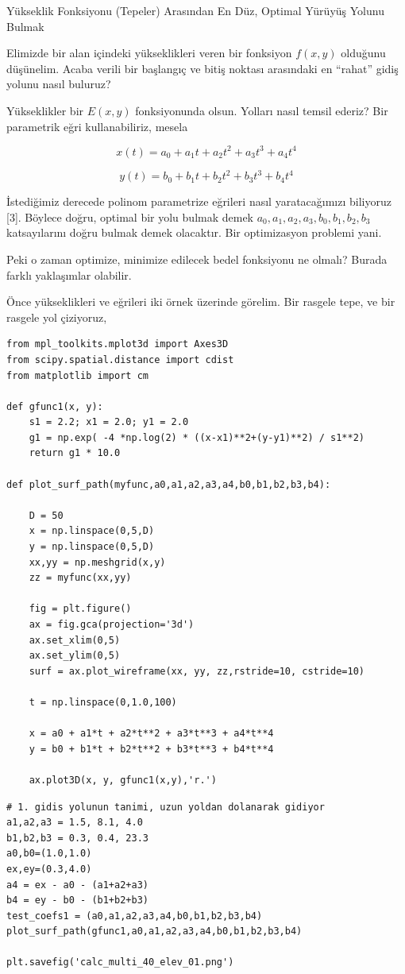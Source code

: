 \documentclass[12pt,fleqn]{article}\usepackage{../../common}
\begin{document}
Yükseklik Fonksiyonu (Tepeler) Arasından En Düz, Optimal Yürüyüş Yolunu Bulmak

Elimizde bir alan içindeki yükseklikleri veren bir fonksiyon $f(x,y)$
olduğunu düşünelim. Acaba verili bir başlangıç ve bitiş noktası arasındaki
en ``rahat'' gidiş yolunu nasıl buluruz? 

Yükseklikler bir $E(x,y)$ fonksiyonunda olsun. Yolları nasıl temsil ederiz?
Bir parametrik eğri kullanabiliriz, mesela 

$$
x(t) = a_0 + a_1 t + a_2 t^2 + a_3 t^3 + a_4 t^4
$$

$$
y(t) = b_0 + b_1 t + b_2 t^2 + b_3 t^3 + b_4 t^4
$$

İstediğimiz derecede polinom parametrize eğrileri nasıl yaratacağımızı
biliyoruz [3]. Böylece doğru, optimal bir yolu bulmak demek
$a_0,a_1,a_2,a_3,b_0,b_1,b_2,b_3$ katsayılarını doğru bulmak demek
olacaktır. Bir optimizasyon problemi yani.

Peki o zaman optimize, minimize edilecek bedel fonksiyonu ne olmalı? Burada
farklı yaklaşımlar olabilir. 

Önce yükseklikleri ve eğrileri iki örnek üzerinde görelim. Bir rasgele
tepe, ve bir rasgele yol çiziyoruz,

\begin{verbatim}
from mpl_toolkits.mplot3d import Axes3D
from scipy.spatial.distance import cdist
from matplotlib import cm

def gfunc1(x, y):
    s1 = 2.2; x1 = 2.0; y1 = 2.0
    g1 = np.exp( -4 *np.log(2) * ((x-x1)**2+(y-y1)**2) / s1**2)
    return g1 * 10.0

def plot_surf_path(myfunc,a0,a1,a2,a3,a4,b0,b1,b2,b3,b4):

    D = 50
    x = np.linspace(0,5,D)
    y = np.linspace(0,5,D)
    xx,yy = np.meshgrid(x,y)
    zz = myfunc(xx,yy)

    fig = plt.figure()
    ax = fig.gca(projection='3d')
    ax.set_xlim(0,5)
    ax.set_ylim(0,5)
    surf = ax.plot_wireframe(xx, yy, zz,rstride=10, cstride=10)

    t = np.linspace(0,1.0,100)

    x = a0 + a1*t + a2*t**2 + a3*t**3 + a4*t**4 
    y = b0 + b1*t + b2*t**2 + b3*t**3 + b4*t**4

    ax.plot3D(x, y, gfunc1(x,y),'r.')
\end{verbatim}

\begin{verbatim}
# 1. gidis yolunun tanimi, uzun yoldan dolanarak gidiyor
a1,a2,a3 = 1.5, 8.1, 4.0
b1,b2,b3 = 0.3, 0.4, 23.3
a0,b0=(1.0,1.0)
ex,ey=(0.3,4.0)
a4 = ex - a0 - (a1+a2+a3)
b4 = ey - b0 - (b1+b2+b3)
test_coefs1 = (a0,a1,a2,a3,a4,b0,b1,b2,b3,b4)
plot_surf_path(gfunc1,a0,a1,a2,a3,a4,b0,b1,b2,b3,b4)

plt.savefig('calc_multi_40_elev_01.png')
\end{verbatim}
\end{document}
